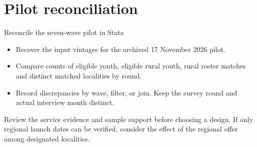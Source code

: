 \section{Pilot reconciliation}
\begin{frame}{Reconcile the seven-wave pilot in Stata}
  \begin{itemize}
    \item Recover the input vintages for the archived 17 November 2026 pilot.
    \item Compare counts of eligible youth, eligible rural youth, rural roster matches and distinct matched localities by round.
    \item Record discrepancies by wave, filter, or join. Keep the survey round and actual interview month distinct.
  \end{itemize}
  \medskip
  Review the service evidence and sample support before choosing a design.
  If only regional launch dates can be verified, consider the effect of the
  regional offer among designated localities.
\end{frame}

% 
% 

